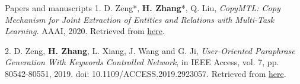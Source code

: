 \documentclass{resume} %
\begin{document}
\begin{rSection}{Papers and manuscripts}
    1. D. Zeng*, \textbf{H. Zhang}*, Q. Liu, \textit{CopyMTL: Copy Mechanism for Joint Extraction of Entities and Relations
    with Multi-Task Learning.} AAAI, 2020. Retrieved from \href{https://arxiv.org/pdf/1911.10438.pdf}{{here}}.

    2. D. Zeng, \textbf{H. Zhang}, L. Xiang, J. Wang and G. Ji, \textit{User-Oriented Paraphrase Generation With Keywords Controlled Network}, in IEEE Access, vol. 7, pp. 80542-80551, 2019.     doi: 10.1109/ACCESS.2019.2923057. Retrieved from \href{https://ieeexplore.ieee.org/stamp/stamp.jsp?tp=&arnumber=8736871}{{here}}.
\end{rSection}



\newpage
\end{document}
